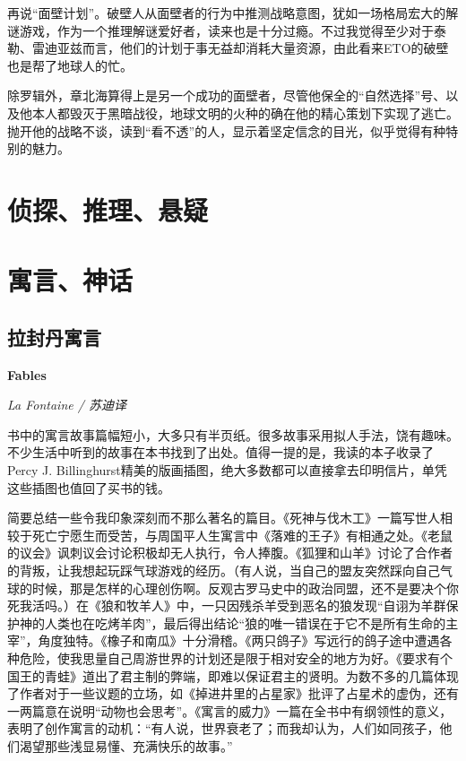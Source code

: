 \par 再说“面壁计划”。破壁人从面壁者的行为中推测战略意图，犹如一场格局宏大的解谜游戏，作为一个推理解谜爱好者，读来也是十分过瘾。不过我觉得至少对于泰勒、雷迪亚兹而言，他们的计划于事无益却消耗大量资源，由此看来ETO的破壁也是帮了地球人的忙。
\par 除罗辑外，章北海算得上是另一个成功的面壁者，尽管他保全的“自然选择”号、以及他本人都毁灭于黑暗战役，地球文明的火种的确在他的精心策划下实现了逃亡。抛开他的战略不谈，读到“看不透”的人，显示着坚定信念的目光，似乎觉得有种特别的魅力。
\par {}

\section{侦探、推理、悬疑}

\section{寓言、神话}

\subsection*{拉封丹寓言}
\par \textbf{Fables}
\par \emph{La Fontaine / 苏迪译} 
\par 书中的寓言故事篇幅短小，大多只有半页纸。很多故事采用拟人手法，饶有趣味。不少生活中听到的故事在本书找到了出处。值得一提的是，我读的本子收录了Percy J. Billinghurst精美的版画插图，绝大多数都可以直接拿去印明信片，单凭这些插图也值回了买书的钱。
\par 简要总结一些令我印象深刻而不那么著名的篇目。《死神与伐木工》一篇写世人相较于死亡宁愿生而受苦，与周国平人生寓言中《落难的王子》有相通之处。《老鼠的议会》讽刺议会讨论积极却无人执行，令人捧腹。《狐狸和山羊》讨论了合作者的背叛，让我想起玩踩气球游戏的经历。（有人说，当自己的盟友突然踩向自己气球的时候，那是怎样的心理创伤啊。反观古罗马史中的政治同盟，还不是要决个你死我活吗。）在《狼和牧羊人》中，一只因残杀羊受到恶名的狼发现“自诩为羊群保护神的人类也在吃烤羊肉”，最后得出结论“狼的唯一错误在于它不是所有生命的主宰”，角度独特。《橡子和南瓜》十分滑稽。《两只鸽子》写远行的鸽子途中遭遇各种危险，使我思量自己周游世界的计划还是限于相对安全的地方为好。《要求有个国王的青蛙》道出了君主制的弊端，即难以保证君主的贤明。为数不多的几篇体现了作者对于一些议题的立场，如《掉进井里的占星家》批评了占星术的虚伪，还有一两篇意在说明“动物也会思考”。《寓言的威力》一篇在全书中有纲领性的意义，表明了创作寓言的动机：“有人说，世界衰老了；而我却认为，人们如同孩子，他们渴望那些浅显易懂、充满快乐的故事。”

